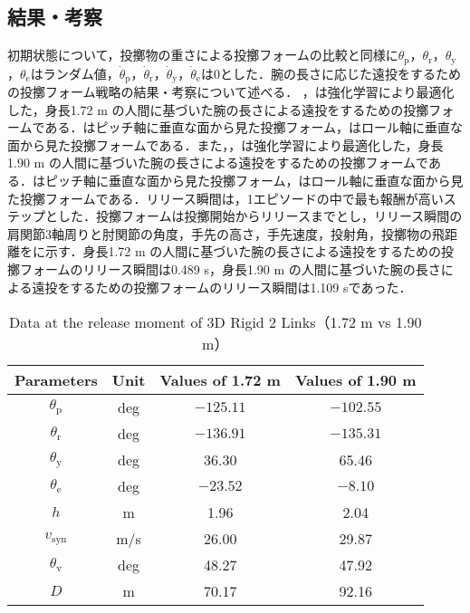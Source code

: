 \subsection{結果・考察}
初期状態について，投擲物の重さによる投擲フォームの比較と同様に$\theta_{\mathrm{p}}$，$\theta_{\mathrm{r}}$，$\theta_{\mathrm{y}}$，$\theta_{\mathrm{e}}$はランダム値，$\dot{\theta}_{\mathrm{p}}$，$\dot{\theta}_{\mathrm{r}}$，$\dot{\theta}_{\mathrm{y}}$，$\dot{\theta}_{\mathrm{e}}$は0とした．腕の長さに応じた遠投をするための投擲フォーム戦略の結果・考察について述べる．
，は強化学習により最適化した，身長1.72 m の人間に基づいた腕の長さによる遠投をするための投擲フォームである．はピッチ軸に垂直な面から見た投擲フォーム，はロール軸に垂直な面から見た投擲フォームである．また，，は強化学習により最適化した，身長1.90 m の人間に基づいた腕の長さによる遠投をするための投擲フォームである．はピッチ軸に垂直な面から見た投擲フォーム，はロール軸に垂直な面から見た投擲フォームである．リリース瞬間は，1エピソードの中で最も報酬が高いステップとした．投擲フォームは投擲開始からリリースまでとし，リリース瞬間の肩関節3軸周りと肘関節の角度，手先の高さ，手先速度，投射角，投擲物の飛距離をに示す．身長1.72 m の人間に基づいた腕の長さによる遠投をするための投擲フォームのリリース瞬間は0.489 s，身長1.90 m の人間に基づいた腕の長さによる遠投をするための投擲フォームのリリース瞬間は1.109 sであった．

\begin{table}[tb]
  \begin{center}
    \caption{Data at the release moment of 3D Rigid 2 Links（1.72 m vs 1.90 m）}
    \begin{tabular}{c|c|c|c}
      \hline
      Parameters & Unit & Values of 1.72 m & Values of 1.90 m \\
      \hline
      $\theta_{\mathrm{p}}$ & deg & $-125.11$ & $-102.55$ \\
      $\theta_{\mathrm{r}}$ & deg & $-136.91$ & $-135.31$ \\
      $\theta_{\mathrm{y}}$ & deg  & 36.30 & 65.46 \\
      $\theta_{\mathrm{e}}$ & deg & $-23.52$ & $-8.10$ \\
      $h$ & m & 1.96 & 2.04 \\
      $v_{\mathrm{syn}}$ & m/s & 26.00 & 29.87 \\
      $\theta_{\mathrm{v}}$ & deg & 48.27 & 47.92 \\
      $D$ & m & 70.17 & 92.16 \\
      \hline
    \end{tabular}
  \end{center}
\end{table}


